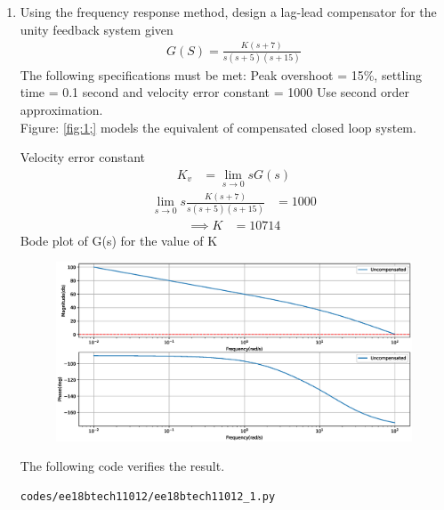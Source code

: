 \begin{enumerate}[label=\thesubsection.\arabic*.,ref=\thesubsection.\theenumi]
\item Using the frequency response method, design a lag-lead compensator for the unity feedback system given 
\begin{align}
G(S) = \frac{K(s+7)}{s(s+5)(s+15)}
\end{align}
The following specifications must be met: Peak overshoot = 15\%, settling time = 0.1 second and velocity error constant = 1000
Use second order approximation. \\
%
\solution Figure: \ref{fig:1;} models the equivalent of compensated closed loop system. 
\begin{figure}[!ht]
\begin{center}
		\resizebox{\columnwidth}{!}{}
\end{center}
\caption{}
\label{fig:ee18btech11012_1;}
\end{figure}
%
Velocity error constant  
\begin{align}
K_{v} &=  \lim_{s \to 0}sG(s)
\end{align}
\begin{align}
\lim_{s \to 0}s\frac{K(s+7)}{s(s+5)(s+15)} &= 1000
\end{align}
\begin{align}
\implies K &= 10714
\end{align}
Bode plot of G(s) for the value of K
\begin{figure}[!ht]
\centering
  \includegraphics[width=\columnwidth]{./figs/ee18btech11012/ee18btech11012.eps}
\caption{}
\label{fig:ee18btech11012_2}
\end{figure}
The following code verifies the result.
\begin{lstlisting}
codes/ee18btech11012/ee18btech11012_1.py

\end{lstlisting}
\end{enumerate}
